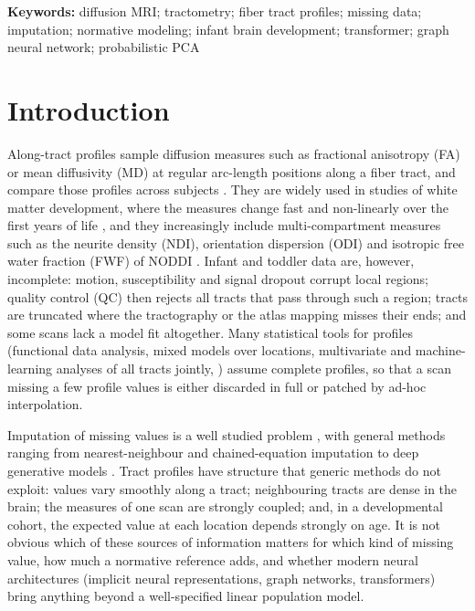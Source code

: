 \documentclass[11pt]{article}
\begin{document}
\noindent\textbf{Keywords:} diffusion MRI; tractometry; fiber tract profiles; missing data; imputation; normative
modeling; infant brain development; transformer; graph neural network; probabilistic PCA

\section{Introduction}

Along-tract profiles sample diffusion measures such as fractional anisotropy (FA) or mean diffusivity (MD) at
regular arc-length positions along a fiber tract, and compare those profiles across subjects
\citep{goodlett2009group,colby2012alongtract,yeatman2012afq,verde2014unc}. They are widely used in studies of white matter development, where the
measures change fast and non-linearly over the first years of life \citep{geng2012tract,dubois2014early}, and they
increasingly include multi-compartment measures such as the neurite density (NDI), orientation dispersion (ODI) and
isotropic free water fraction (FWF) of NODDI \citep{zhang2012noddi}. Infant and toddler data are, however, incomplete:
motion, susceptibility and signal dropout corrupt local regions; quality control (QC) then rejects all tracts that
pass through such a region; tracts are truncated where the tractography or the atlas mapping misses their ends; and
some scans lack a model fit altogether. Many statistical tools for profiles (functional data analysis, mixed models
over locations, multivariate and machine-learning analyses of all tracts jointly,
\citealp{chamberland2019dimensionality,richiehalford2021afqinsight}) assume complete profiles, so that a scan
missing a few profile values is either discarded in full or patched by ad-hoc interpolation.

Imputation of missing values is a well studied problem \citep{rubin1976inference,little2019missing}, with general
methods ranging from nearest-neighbour \citep{troyanskaya2001knn} and chained-equation \citep{vanbuuren2011mice}
imputation to deep generative models \citep{mattei2019miwae,ma2019eddi}. Tract profiles have structure that generic
methods do not exploit: values vary smoothly along a tract; neighbouring tracts are dense in the brain; the
measures of one scan are strongly coupled; and, in a developmental cohort, the expected value at each location
depends strongly on age. It is not obvious which of these sources of information matters for which kind of missing
value, how much a normative reference adds, and whether modern neural architectures (implicit neural representations,
graph networks, transformers) bring anything beyond a well-specified linear population model.
\end{document}
